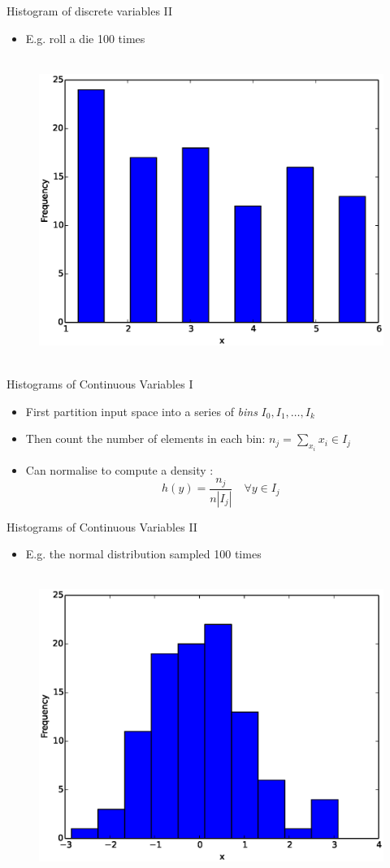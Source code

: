 \documentclass{beamer}
\begin{document}
\begin{frame}{Histogram of discrete variables II}
\begin{itemize}
 \item E.g. roll a die 100 times 
\end{itemize}
\begin{figure}[htp]
\mbox{
\includegraphics[width=0.5\linewidth]{DiscreteHist.eps}
}
\end{figure}
\end{frame}

\begin{frame}{Histograms of Continuous Variables I}  
 \begin{itemize} 
  \item First partition input space into a series of \emph{bins} $I_0, I_1, \ldots, I_k$ 
  \item Then count the number of elements in each bin: $n_j = \sum_{x_i} x_i \in I_j$
  \item Can normalise to compute a density : 
  \begin{displaymath} 
    h(y) = \frac{n_j}{n |I_j|} \quad \forall y \in I_j
  \end{displaymath}
 \end{itemize}
\end{frame}

\begin{frame}{Histograms of Continuous Variables II}  
\begin{itemize}
 \item E.g. the normal distribution sampled 100 times 
\end{itemize}
\begin{figure}[htp]
\mbox{
\includegraphics[width=0.5\linewidth]{ContinuousHist.eps}
}
\end{figure} 
\end{frame}
\end{document}
